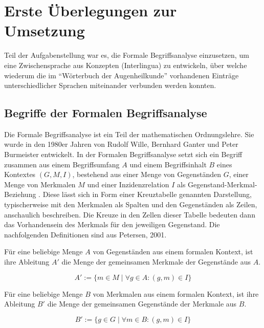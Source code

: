 \documentclass[pagesize,paper=A4,DIV=calc,fontsize=12pt,draft=false]{scrreprt}
\begin{document}
\section{Erste Überlegungen zur Umsetzung}

Teil der Aufgabenstellung war es, die Formale Begriffsanalyse einzusetzen, um eine Zwischensprache aus Konzepten (Interlingua) zu entwickeln, über welche wiederum die im \enquote{Wörterbuch der Augenheilkunde} vorhandenen Einträge unterschiedlicher Sprachen miteinander verbunden werden konnten.

\subsection{Begriffe der Formalen Begriffsanalyse}
\label{subsec:fba}

Die Formale Begriffsanalyse ist ein Teil der mathematischen Ordnungslehre. 
Sie wurde in den 1980er Jahren von Rudolf Wille, Bernhard Ganter und Peter Burmeister entwickelt. 
In der Formalen Begriffsanalyse setzt sich ein Begriff zusammen aus einem  Begriffsumfang $A$ und einem Begriffsinhalt $B$ eines Kontextes $(G,M,I)$, bestehend aus einer Menge von Gegenständen $G$, einer Menge von Merkmalen $M$ und einer Inzidenzrelation $I$ als Gegenstand-Merkmal-Beziehung \parencite[Seiten 18 und 58]{ganter1996}. 
Diese lässt sich in Form einer Kreuztabelle genannten Darstellung, typischerweise mit den Merkmalen als Spalten und den Gegenständen als Zeilen, anschaulich beschreiben. 
Die Kreuze in den Zellen dieser Tabelle bedeuten dann das Vorhandensein des Merkmals für den jeweiligen Gegenstand.
Die nachfolgenden Definitionen sind aus Petersen, 2001. 

Für eine beliebige Menge $A$ von Gegenständen aus einem formalen Kontext, ist ihre Ableitung $A'$ die Menge der gemeinsamen Merkmale der Gegenstände aus $A$. 

\begin{equation*}
A' := \lbrace m \in M \; \vert \; \forall g \in A: (g,m) \in I\rbrace
\end{equation*}

Für eine beliebige Menge $B$ von Merkmalen aus einem formalen Kontext, ist ihre Ableitung $B'$ die Menge der gemeinsamen Gegenstände der Merkmale aus $B$. 

\begin{equation*}
B' := \lbrace g \in G \; \vert \; \forall m \in B: (g,m) \in I\rbrace
\end{equation*}
\end{document}

